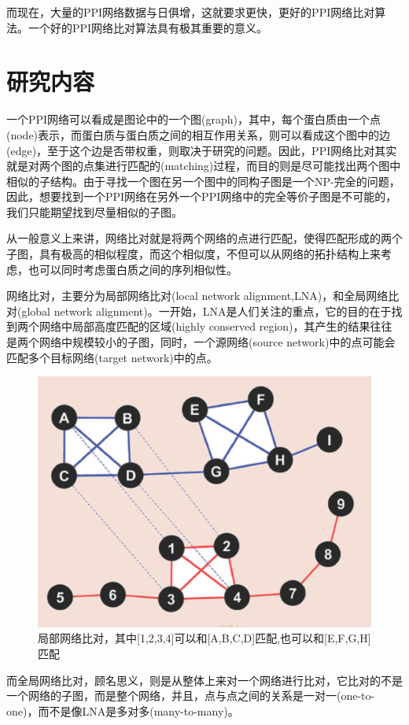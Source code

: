 而现在，大量的PPI网络数据与日俱增\cite{breitkreutz2008biogrid,hulovatyy2014revealing}，这就要求更快，更好的PPI网络比对算法。一个好的PPI网络比对算法具有极其重要的意义。

\section{研究内容}
一个PPI网络可以看成是图论中的一个图(graph)，其中，每个蛋白质由一个点(node)表示，而蛋白质与蛋白质之间的相互作用关系，则可以看成这个图中的边(edge)，至于这个边是否带权重，则取决于研究的问题。因此，PPI网络比对其实就是对两个图的点集进行匹配的(matching)过程，而目的则是尽可能找出两个图中相似的子结构。由于寻找一个图在另一个图中的同构子图是一个NP-完全的问题\cite{cook1971complexity}，因此，想要找到一个PPI网络在另外一个PPI网络中的完全等价子图是不可能的，我们只能期望找到尽量相似的子图。

从一般意义上来讲，网络比对就是将两个网络的点进行匹配，使得匹配形成的两个子图，具有极高的相似程度，而这个相似度，不但可以从网络的拓扑结构上来考虑，也可以同时考虑蛋白质之间的序列相似性。

网络比对，主要分为局部网络比对(local network alignment,LNA)，和全局网络比对(global network alignment)。一开始，LNA是人们关注的重点，它的目的在于找到两个网络中局部高度匹配的区域(highly conserved region)，其产生的结果往往是两个网络中规模较小的子图，同时，一个源网络(source network)中的点可能会匹配多个目标网络(target network)中的点。

\begin{figure}[htbp]
\centering
\includegraphics[height=0.25\textheight]{pic/lna.png}
\caption{局部网络比对，其中[1,2,3,4]可以和[A,B,C,D]匹配,也可以和[E,F,G,H]匹配 \cite{atias2012comparative} \label{fig:lna}}
\end{figure}
而全局网络比对，顾名思义，则是从整体上来对一个网络进行比对，它比对的不是一个网络的子图，而是整个网络，并且，点与点之间的关系是一对一(one-to-one)，而不是像LNA是多对多(many-to-many)。


